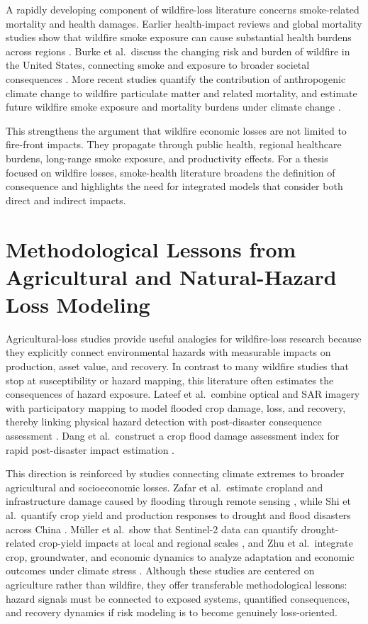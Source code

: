 A rapidly developing component of wildfire-loss literature concerns smoke-related mortality and health damages. Earlier health-impact reviews and global mortality studies show that wildfire smoke exposure can cause substantial health burdens across regions \citep{johnston2012global,reid2016critical}. Burke et al.\ discuss the changing risk and burden of wildfire in the United States, connecting smoke and exposure to broader societal consequences \citep{burke2021smoke}. More recent studies quantify the contribution of anthropogenic climate change to wildfire particulate matter and related mortality, and estimate future wildfire smoke exposure and mortality burdens under climate change \citep{law2025anthropogenic,qiu2025wildfiresmoke}.

This strengthens the argument that wildfire economic losses are not limited to fire-front impacts. They propagate through public health, regional healthcare burdens, long-range smoke exposure, and productivity effects. For a thesis focused on wildfire losses, smoke-health literature broadens the definition of consequence and highlights the need for integrated models that consider both direct and indirect impacts.

\section{Methodological Lessons from Agricultural and Natural-Hazard Loss Modeling}

Agricultural-loss studies provide useful analogies for wildfire-loss research because they explicitly connect environmental hazards with measurable impacts on production, asset value, and recovery. In contrast to many wildfire studies that stop at susceptibility or hazard mapping, this literature often estimates the consequences of hazard exposure. Lateef et al.\ combine optical and SAR imagery with participatory mapping to model flooded crop damage, loss, and recovery, thereby linking physical hazard detection with post-disaster consequence assessment \citep{lateef2025floodedcrop}. Dang et al.\ construct a crop flood damage assessment index for rapid post-disaster impact estimation \citep{dang2024cropflood}.

This direction is reinforced by studies connecting climate extremes to broader agricultural and socioeconomic losses. Zafar et al.\ estimate cropland and infrastructure damage caused by flooding through remote sensing \citep{zafar2024flooddamages}, while Shi et al.\ quantify crop yield and production responses to drought and flood disasters across China \citep{shi2021cropyield}. M\"uller et al.\ show that Sentinel-2 data can quantify drought-related crop-yield impacts at local and regional scales \citep{mueller2025droughtsweden}, and Zhu et al.\ integrate crop, groundwater, and economic dynamics to analyze adaptation and economic outcomes under climate stress \citep{zhu2025ogallala}. Although these studies are centered on agriculture rather than wildfire, they offer transferable methodological lessons: hazard signals must be connected to exposed systems, quantified consequences, and recovery dynamics if risk modeling is to become genuinely loss-oriented.

